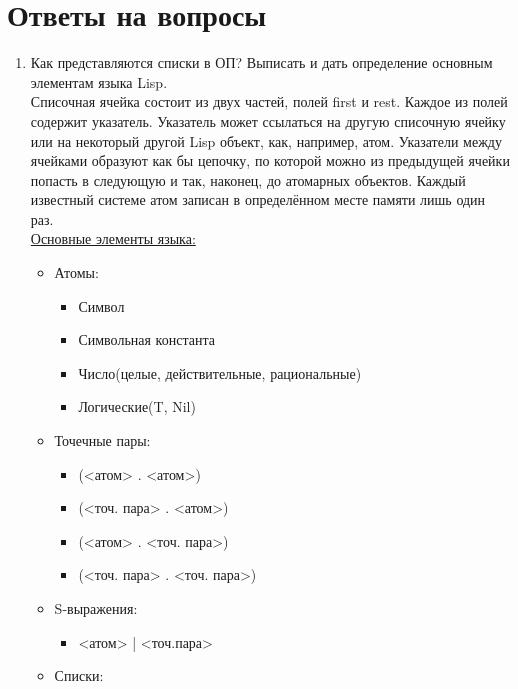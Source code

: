 \newpage
\section*{Ответы на вопросы}
\begin{enumerate}
    \item\Large{Как представляются списки в ОП? Выписать и дать определение основным элементам языка Lisp.}\\
         Списочная ячейка состоит из двух частей, полей first и rest. Каждое из полей содержит указатель. Указатель может ссылаться на другую списочную ячейку или на некоторый другой Lisp объект, как, например, атом. Указатели между ячейками образуют как бы цепочку, по которой можно из предыдущей ячейки попасть в следующую и так, наконец, до атомарных объектов. Каждый известный системе атом записан в определённом месте памяти лишь один раз.\\
    \underline{Основные элементы языка:}
        \begin{itemize}
            \item Атомы:
                \begin{itemize}
                    \item Символ
                    \item Символьная константа
                    \item Число(целые, действительные, рациональные)
                    \item Логические(T, Nil)
                \end{itemize}
            \item Точечные пары:
                \begin{itemize}
                    \item (<атом> . <атом>)
                    \item (<точ. пара> . <атом>)
                    \item (<атом> . <точ. пара>)
                    \item (<точ. пара> . <точ. пара>)
                \end{itemize}
            \item S-выражения:
                \begin{itemize}
                    \item <атом> | <точ.пара>
                \end{itemize}
            \item Списки:

\end{itemize}
\end{enumerate}
